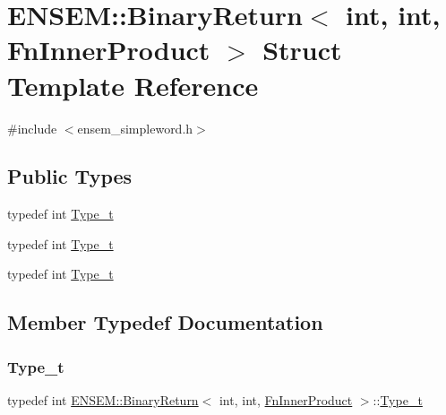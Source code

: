 \hypertarget{structENSEM_1_1BinaryReturn_3_01int_00_01int_00_01FnInnerProduct_01_4}{}\section{E\+N\+S\+EM\+:\+:Binary\+Return$<$ int, int, Fn\+Inner\+Product $>$ Struct Template Reference}
\label{structENSEM_1_1BinaryReturn_3_01int_00_01int_00_01FnInnerProduct_01_4}


{\ttfamily \#include $<$ensem\+\_\+simpleword.\+h$>$}

\subsection*{Public Types}
\begin{DoxyCompactItemize}
\item 
typedef int \mbox{\hyperlink{structENSEM_1_1BinaryReturn_3_01int_00_01int_00_01FnInnerProduct_01_4_a702d8c8623acf6a0b21fd2fc27b4fa44}{Type\+\_\+t}}
\item 
typedef int \mbox{\hyperlink{structENSEM_1_1BinaryReturn_3_01int_00_01int_00_01FnInnerProduct_01_4_a702d8c8623acf6a0b21fd2fc27b4fa44}{Type\+\_\+t}}
\item 
typedef int \mbox{\hyperlink{structENSEM_1_1BinaryReturn_3_01int_00_01int_00_01FnInnerProduct_01_4_a702d8c8623acf6a0b21fd2fc27b4fa44}{Type\+\_\+t}}
\end{DoxyCompactItemize}


\subsection{Member Typedef Documentation}
\mbox{\label{structENSEM_1_1BinaryReturn_3_01int_00_01int_00_01FnInnerProduct_01_4_a702d8c8623acf6a0b21fd2fc27b4fa44}} 
\subsubsection{\texorpdfstring{Type\_t}{Type\_t}\hspace{0.1cm}{\footnotesize\ttfamily [1/3]}}
{\footnotesize\ttfamily typedef int \mbox{\hyperlink{structENSEM_1_1BinaryReturn}{E\+N\+S\+E\+M\+::\+Binary\+Return}}$<$ int, int, \mbox{\hyperlink{structENSEM_1_1FnInnerProduct}{Fn\+Inner\+Product}} $>$\+::\mbox{\hyperlink{structENSEM_1_1BinaryReturn_3_01int_00_01int_00_01FnInnerProduct_01_4_a702d8c8623acf6a0b21fd2fc27b4fa44}{Type\+\_\+t}}}


